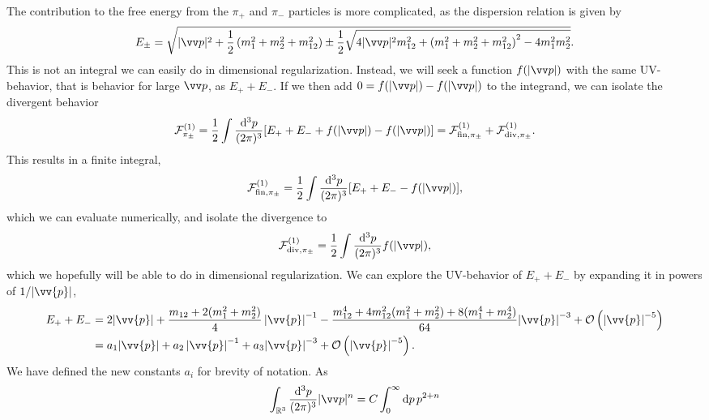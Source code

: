 The contribution to the free energy from the $\pi_+$ and $\pi_-$ particles is more complicated, as the dispersion relation is given by
\begin{equation}
    E_\pm
    = 
    \sqrt{
        |\vv p|^2 +
        \frac{1}{2}
        \left(
            m_1^2 + m_2^2 + m_{12}^2 
        \right)
        \pm 
        \frac{1}{2}
        \sqrt{
            4|\vv p|^2m_{12}^2 
            +
            \left(
                m_1^2 + m_2^2 + m_{12}^2
            \right)^2
            - 4 m_1^2 m_2^2
        }
    }.
\end{equation}
This is not an integral we can easily do in dimensional regularization.
Instead, we will seek a function $f(|\vv p|)$ with the same UV-behavior, that is behavior for large $\vv p$, as $E_+ + E_-$.
If we then add $0 = f(|\vv p|) - f(|\vv p|)$ to the integrand, we can isolate the divergent behavior
\begin{equation}
    \Ef_{\pi_\pm}^{(1)}
    = 
    \frac{1}{2} \int \frac{\dd^3 p}{(2\pi)^3} [E_+ + E_- + f(|\vv p|) - f(|\vv p|)]
    = \Ef^{(1)}_{\mathrm{fin}, \pi_\pm } + \Ef^{(1)}_{\mathrm{div}, \pi_\pm}.
\end{equation}
This results in a finite integral, 
\begin{equation}
    \Ef^{(1)}_{\mathrm{fin}, \pi_\pm } = \frac{1}{2} \int \frac{\dd^3 p}{(2\pi)^3} [E_+ + E_- - f(|\vv p|)],
\end{equation}
which we can evaluate numerically, and isolate the divergence to
\begin{equation}
    \Ef^{(1)}_{\mathrm{div}, \pi_\pm }
    = 
    \frac{1}{2} \int \frac{\dd^3 p}{(2\pi)^3} f(|\vv p|),
\end{equation}
which we hopefully will be able to do in dimensional regularization.
We can explore the UV-behavior of $E_+ + E_-$ by expanding it in powers of $1 / \abs{\vv{p}}$,
\begin{align}
    \nonumber
    E_+ + E_-
    & = 
    2  \abs{\vv{p}}
    + \frac{m_{12} + 2(m_1^2 + m_2^2)}{4} \, {\abs{\vv{p}}}^{-1}
    - \frac{m_{12}^4 + 4 m_{12}^2(m_1^2 + m_2^2) + 8(m_1^4 + m_2^4)}{64}
    {\abs{\vv{p}}}^{-3}
    + \Oh[-5]{ \abs{\vv{p}}} 
    \\
    & = 
    a_1  \abs{\vv{p}}
    + a_2 \, {\abs{\vv{p}}}^{-1}
    + a_3
    {\abs{\vv{p}}}^{-3}
    + \Oh[-5]{ \abs{\vv{p}}}.
\end{align}
We have defined the new constants $a_i$ for brevity of notation.
As
\begin{equation}
    \int_{\R^3} \frac{\dd^3 p}{(2 \pi)^3} |\vv p|^{n}
    = C \int_{0}^\infty \dd p \, p^{2 + n}
\end{equation}
